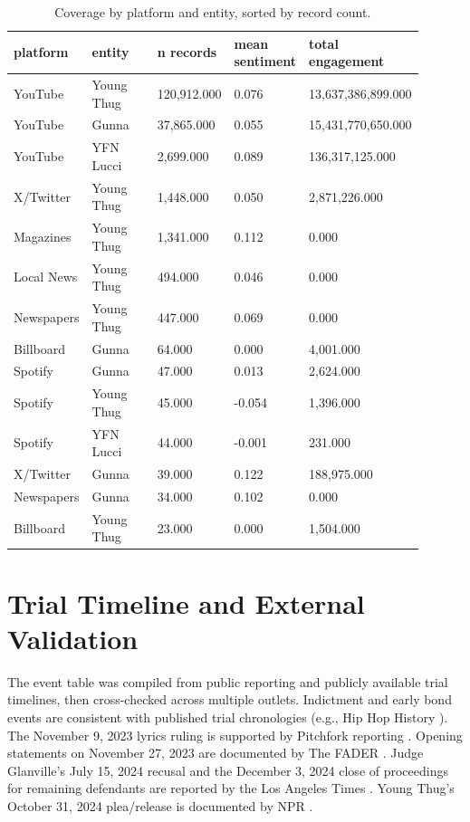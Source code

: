 \documentclass[12pt]{article}
\begin{document}
\begin{table}[H]
\centering
\caption{Coverage by platform and entity, sorted by record count.}
\label{tab:coverage}
\small
\begin{tabular}{p{0.18\linewidth}p{0.18\linewidth}p{0.18\linewidth}p{0.18\linewidth}p{0.18\linewidth}}
\toprule
platform & entity & n records & mean sentiment & total engagement \\
\midrule
YouTube & Young Thug & 120,912.000 & 0.076 & 13,637,386,899.000 \\
YouTube & Gunna & 37,865.000 & 0.055 & 15,431,770,650.000 \\
YouTube & YFN Lucci & 2,699.000 & 0.089 & 136,317,125.000 \\
X/Twitter & Young Thug & 1,448.000 & 0.050 & 2,871,226.000 \\
Magazines & Young Thug & 1,341.000 & 0.112 & 0.000 \\
Local News & Young Thug & 494.000 & 0.046 & 0.000 \\
Newspapers & Young Thug & 447.000 & 0.069 & 0.000 \\
Billboard & Gunna & 64.000 & 0.000 & 4,001.000 \\
Spotify & Gunna & 47.000 & 0.013 & 2,624.000 \\
Spotify & Young Thug & 45.000 & -0.054 & 1,396.000 \\
Spotify & YFN Lucci & 44.000 & -0.001 & 231.000 \\
X/Twitter & Gunna & 39.000 & 0.122 & 188,975.000 \\
Newspapers & Gunna & 34.000 & 0.102 & 0.000 \\
Billboard & Young Thug & 23.000 & 0.000 & 1,504.000 \\
\bottomrule
\end{tabular}
\end{table}


\newpage
\section{Trial Timeline and External Validation}
The event table was compiled from public reporting and publicly available trial timelines, then cross-checked across multiple outlets. Indictment and early bond events are consistent with published trial chronologies (e.g., Hip Hop History \cite{hiphophistory}). The November 9, 2023 lyrics ruling is supported by Pitchfork reporting \cite{pitchforklyrics}. Opening statements on November 27, 2023 are documented by The FADER \cite{faderopen}. Judge Glanville's July 15, 2024 recusal and the December 3, 2024 close of proceedings for remaining defendants are reported by the Los Angeles Times \cite{latimesrecusal,latimesend}. Young Thug's October 31, 2024 plea/release is documented by NPR \cite{nprplea}.
\end{document}

